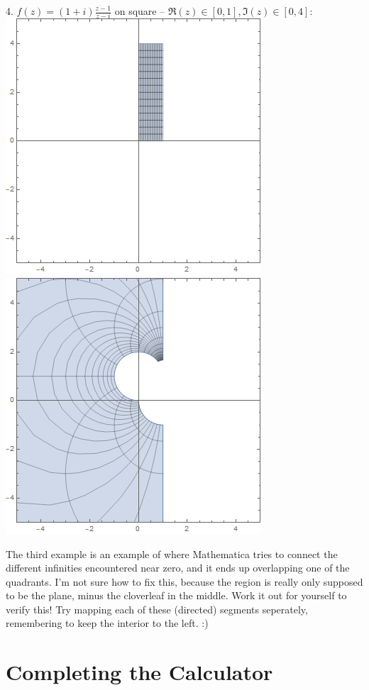 \documentclass[12pt]{scrartcl}
\begin{document}
\begin{center}
	4. $f(z) = (1+i)\frac{z-1}{z-i}$ on square -- $\Re(z) \in [0,1], \Im(z) \in [0,4]$: \\
	\includegraphics[scale=0.3]{images/mobius4dom.png}
	\includegraphics[scale=0.3]{images/mobius4ran.png}
\end{center}
The third example is an example of where Mathematica tries to connect the different infinities encountered near zero, and it ends up overlapping one of the quadrants. I'm not sure how to fix this, because the region is really only supposed to be the plane, minus the cloverleaf in the middle. Work it out for yourself to verify this! Try mapping each of these (directed) segments seperately, remembering to keep the interior to the left. :)
\section{Completing the Calculator}
\end{document}
